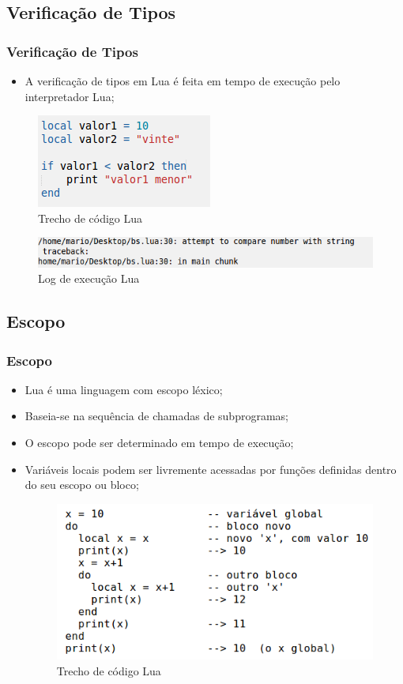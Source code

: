 \documentclass{beamer}
\begin{document}
\subsection{Verificação de Tipos}
\begin{frame}[fragile]
\frametitle{Verificação de Tipos}
	\begin{itemize}
	\item A verificação de tipos em Lua é feita em tempo de execução pelo interpretador Lua;
	\end{itemize}
	\begin{figure}[H]
			\centering
			\includegraphics[width=0.3\linewidth]{imagens/verificacao_tipo}
			\caption{Trecho de código Lua}
	\end{figure}

	\begin{figure}[H]
			\centering
			\includegraphics[width=1\linewidth]{imagens/verificacao_tipo2}
			\caption{Log de execução Lua}
	\end{figure}
\end{frame}

\subsection{Escopo}
\begin{frame}[fragile]
\frametitle{Escopo}
	\begin{itemize}
	\item<1-> Lua é uma linguagem com escopo léxico; 
	\item<2-> Baseia-se na sequência de chamadas de subprogramas;
	\item<3-> O escopo pode ser determinado em tempo de execução;
	\item<5-> Variáveis locais podem ser livremente acessadas por funções definidas dentro do seu escopo ou bloco;
	\begin{figure}[H]
			\centering
			\includegraphics[width=0.6\linewidth]{imagens/imagem3}
			\caption{Trecho de código Lua}
		\end{figure}
	\end{itemize}
\end{frame}
\end{document}
